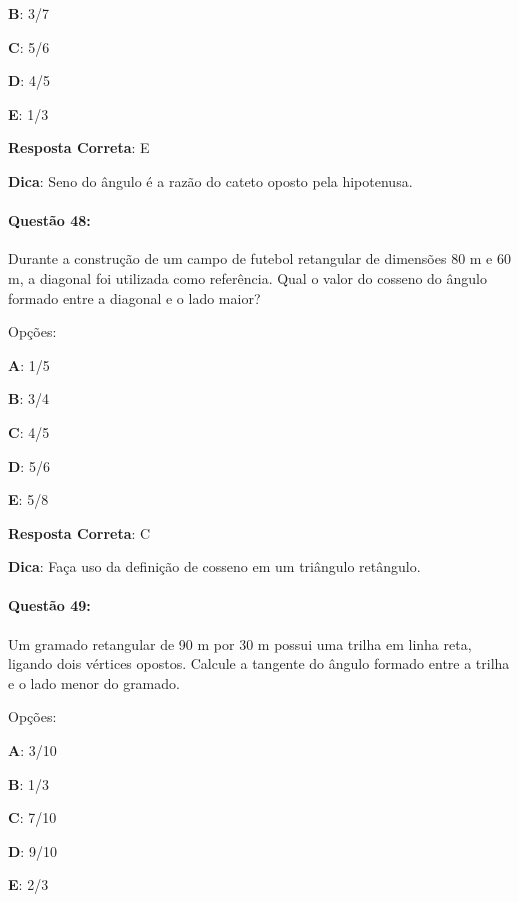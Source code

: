 \documentclass{article}
\begin{document}
\textbf{B}: 3/7 

\textbf{C}: 5/6 

\textbf{D}: 4/5 

\textbf{E}: 1/3 

\vspace{\baselineskip}\textbf{Resposta Correta}: E

\vspace{\baselineskip}\textbf{Dica}: Seno do ângulo é a razão do cateto oposto pela hipotenusa.

\paragraph{Questão 48:}
{Durante a construção de um campo de futebol retangular de dimensões 80 m e 60 m, a diagonal foi utilizada como referência. Qual o valor do cosseno do ângulo formado entre a diagonal e o lado maior?}

\vspace{\baselineskip}Opções:

\vspace{\baselineskip}\textbf{A}: 1/5 

\textbf{B}: 3/4 

\textbf{C}: 4/5 

\textbf{D}: 5/6 

\textbf{E}: 5/8 

\vspace{\baselineskip}\textbf{Resposta Correta}: C

\vspace{\baselineskip}\textbf{Dica}: Faça uso da definição de cosseno em um triângulo retângulo.

\paragraph{Questão 49:}
{Um gramado retangular de 90 m por 30 m possui uma trilha em linha reta, ligando dois vértices opostos. Calcule a tangente do ângulo formado entre a trilha e o lado menor do gramado.}

\vspace{\baselineskip}Opções:

\vspace{\baselineskip}\textbf{A}: 3/10 

\textbf{B}: 1/3 

\textbf{C}: 7/10 

\textbf{D}: 9/10 

\textbf{E}: 2/3 
\end{document}
